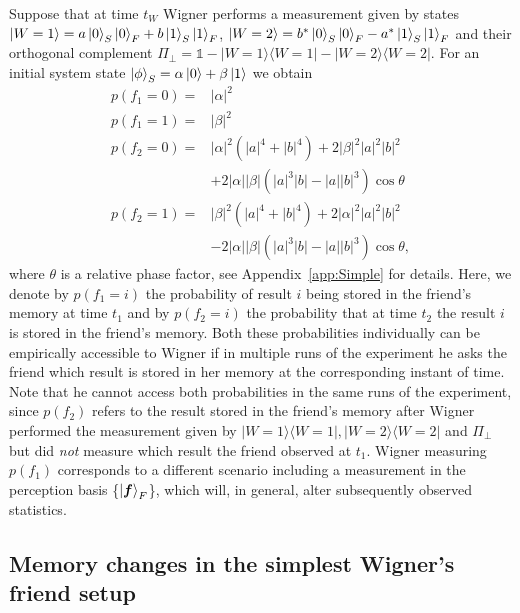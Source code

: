 \documentclass[a4paper,twocolumn,11pt,accepted=2017-05-09,dvipsnames]{quantumarticle}
\numberwithin{equation}{section}
\newcommand{\proj}[1]{|#1\rangle\langle#1|}
\begin{document}
Suppose that at time $t_W$ Wigner performs a measurement given by states $\ket{W=1}= a\ket{0}_S\ket{0}_F+b\ket{1}_S\ket{1}_F$, $\ket{W=2}=b^*\ket{0}_S\ket{0}_F-a^*\ket{1}_S\ket{1}_F$ and their orthogonal complement $\Pi_{\perp}=\mathds{1}-\proj{W=1}-\proj{W=2}$. For an initial system state $\ket{\phi}_S=\alpha \ket{0} + \beta \ket{1}$ we obtain
\begin{align}
p(f_1=0)=& |\alpha|^2  \\
p(f_1=1)=& |\beta|^2   \\
\label{pf20} 
p(f_2=0)=& |\alpha|^2 (|a|^4+|b|^4)+2 |\beta|^2|a|^2|b|^2 \\ \nonumber
	 &+ 2|\alpha| |\beta| (|a|^3|b| - |a||b|^3)\cos{\theta} \\ 
\label{pf21}
p(f_2=1)=& |\beta|^2 (|a|^4+|b|^4)+2 |\alpha|^2|a|^2|b|^2 \\ \nonumber
	&- 2|\alpha| |\beta| (|a|^3|b| - |a||b|^3)\cos{\theta},
\end{align}
where $\theta$ is a relative phase factor, see Appendix~\ref{app:Simple} for details. Here, we denote by $p(f_1=i)$ the probability of result $i$ being stored in the friend's memory at time $t_1$ and by $p(f_2=i)$ the probability that at time $t_2$ the result $i$ is stored in the friend's memory. Both these probabilities individually can be empirically accessible to Wigner if in multiple runs of the experiment he asks the friend which result is stored in her memory at the corresponding instant of time. Note that he cannot access both probabilities in the same runs of the experiment, since $p(f_2)$ refers to the result stored in the friend's memory after Wigner performed the measurement given by $\proj{W=1}, \proj{W=2}$ and $\Pi_{\perp}$ but did \emph{not} measure which result the friend observed at $t_1$. Wigner measuring $p(f_1)$ corresponds to a different scenario including a measurement in the perception basis \{$\ket{\bm{f}}_F$\}, which will, in general, alter  subsequently observed statistics.

\subsection{Memory changes in the simplest Wigner's friend setup}
\label{Changes_S}
\end{document}
